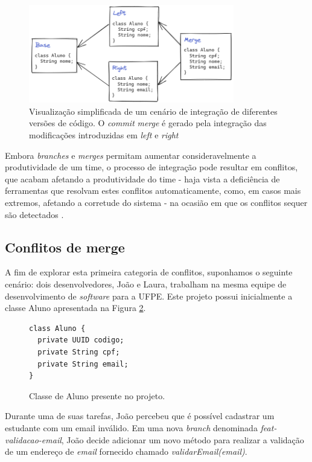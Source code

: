 \documentclass[12pt]{article}
\begin{document}
\begin{figure}[H]
    \centering
    \includegraphics[width=0.80\textwidth]{imagens/merge.png}
    \caption{Visualização simplificada de um cenário de integração de diferentes versões de código. O \textit{commit} \textit{merge} é gerado pela integração das modificações introduzidas em \textit{left} e \textit{right}}
    \label{fig:commits}
\end{figure}

Embora \textit{branches} e \textit{merges} permitam aumentar consideravelmente a produtividade de um time, o processo de integração pode resultar em conflitos, que acabam afetando a produtividade do time - haja vista a deficiência de ferramentas que resolvam estes conflitos automaticamente, como, em casos mais extremos, afetando a corretude do sistema - na ocasião em que os conflitos sequer são detectados \cite{cavalcanti:icse}.

\subsection{Conflitos de merge}
A fim de explorar esta primeira categoria de conflitos, suponhamos o seguinte cenário: dois desenvolvedores, João e Laura, trabalham na mesma equipe de desenvolvimento de \textit{software} para a UFPE. Este projeto possui inicialmente a classe Aluno apresentada na Figura \ref{fig:merge1}.

\begin{figure}[H]
\begin{verbatim}
class Aluno {
  private UUID codigo;
  private String cpf;
  private String email;
}
\end{verbatim}
\caption{Classe de Aluno presente no projeto.}
\label{fig:merge1}
\end{figure}

Durante uma de suas tarefas, João percebeu que é possível cadastrar um estudante com um email inválido. Em uma nova \textit{branch} denominada \textit{feat-validacao-email}, João decide adicionar um novo método para realizar a validação de um endereço de \textit{email} fornecido chamado \textit{validarEmail(email)}.
\end{document}
